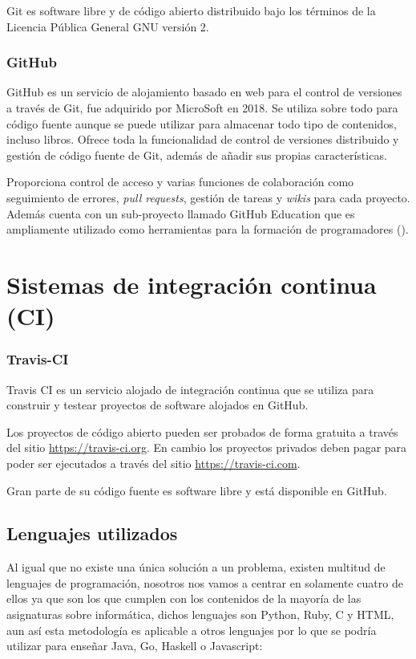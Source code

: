 Git es software libre y de código abierto distribuido bajo los términos de la Licencia Pública General GNU versión 2.

\subsubsection {GitHub}

GitHub es un servicio de alojamiento basado en web para el control de versiones a través de Git, fue adquirido por MicroSoft en 2018. Se utiliza sobre todo para código fuente aunque se puede utilizar para almacenar todo tipo de contenidos, incluso libros. Ofrece toda la funcionalidad de control de versiones distribuido y gestión de código fuente de Git, además de añadir sus propias características.

Proporciona control de acceso y varias funciones de colaboración como seguimiento de errores, \textit{pull requests}, gestión de tareas y \textit{wikis} para cada proyecto. Además cuenta con un sub-proyecto llamado GitHub Education que es ampliamente utilizado como herramientas para la formación de programadores (\cite{hernandez_integracion_2018}).


\section {Sistemas de integración continua (CI)}

\subsubsection {Travis-CI}

Travis CI es un servicio alojado de integración continua que se utiliza para construir y testear proyectos de software alojados en GitHub.

Los proyectos de código abierto pueden ser probados de forma gratuita a través del sitio \url{https://travis-ci.org}. En cambio los proyectos privados deben pagar para poder ser ejecutados a través del sitio \url{https://travis-ci.com}.

Gran parte de su código fuente es software libre y está disponible en GitHub.

\subsection{Lenguajes utilizados}

Al igual que no existe una única solución a un problema, existen multitud de lenguajes de programación, nosotros nos vamos a centrar en solamente cuatro de ellos ya que son los que cumplen con los contenidos de la mayoría de las asignaturas sobre informática, dichos lenguajes son Python, Ruby, C y HTML, aun así esta metodología es aplicable a otros lenguajes por lo que se podría utilizar para enseñar Java, Go, Haskell o Javascript:

